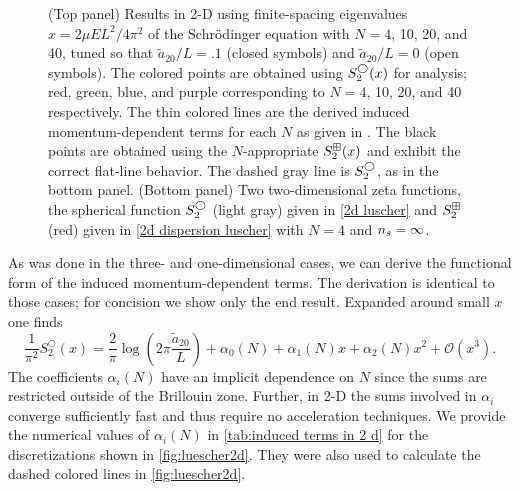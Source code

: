 \begin{figure}
    \center
    
    \caption{
        (Top panel)
        Results in 2-D using finite-spacing eigenvalues $x=2\mu EL^2/4\pi^2$ of the Schr\"odinger equation with $N=4$, 10, 20, and 40, tuned so that $\tilde a_{20}/L=.1$ (closed symbols) and $\tilde a_{20}/L=0$ (open symbols).
        The colored points are obtained using $S^\bigcirc_2(x)$ for analysis; red, green, blue, and purple corresponding to $N=4$, 10, 20, and 40 respectively.
        The thin colored lines are the derived induced momentum-dependent terms for each $N$ as given in .
        The black points are obtained using the $N$-appropriate $S^{\boxplus}_2(x)$ and exhibit the correct flat-line behavior.
        The dashed gray line is $S_2^\bigcirc$, as in the bottom panel.
        (Bottom panel)
        Two two-dimensional zeta functions, the spherical function $S_2^{\bigcirc}$ (light gray) given in \eqref{2d luscher} and $S_2^{\boxplus}$ (red) given in \eqref{2d dispersion luscher} with $N=4$ and ${n_s}=\infty$.
        }
    \label{fig:luescher2d}
\end{figure}

As was done in the three- and one-dimensional cases, we can derive the functional form of the induced momentum-dependent terms.
The derivation is identical to those cases; for concision we show only the end result.
Expanded around small $x$ one finds
\begin{equation}
    \frac{1}{ \pi^{2}} S^\bigcirc_{2}\left(x\right)
    =
    \frac{2}{\pi}\log\left(2\pi \frac{\tilde a_{20}}{L}\right)
    + \alpha_0(N)
    + \alpha_1(N) x
    + \alpha_2(N) x^2
    + \mathcal{O}(x^3).
\end{equation}
The coefficients $\alpha_i(N)$ have an implicit dependence on $N$ since the sums are restricted outside of the Brillouin zone.  Further, in 2-D the sums involved in $\alpha_i$ converge sufficiently fast and thus require no acceleration techniques.  We provide the numerical values of $\alpha_i(N)$ in \autoref{tab:induced terms in 2 d} for the discretizations shown in \autoref{fig:luescher2d}.  They were also used to calculate the dashed colored lines in \autoref{fig:luescher2d}.

